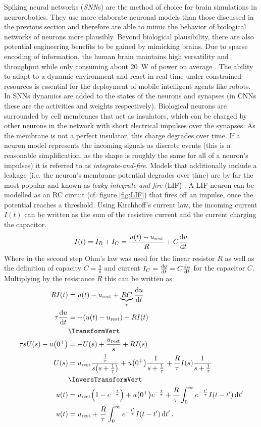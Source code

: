 Spiking neural networks (\emph{SNN}s) are the method of choice for brain simulations in neurorobotics. They use more elaborate neuronal models than those discussed in the previous section and therefore are able to mimic the behavior of biological networks of neurons more plausibly. Beyond biological plausibility, there are also potential engineering benefits to be gained by mimicking brains. Due to sparse encoding of information, the human brain maintains high versatility and throughput while only consuming about \SI{20}{\watt} of power on average \cite{brainexplained}. The ability to adapt to a dynamic environment and react in real-time under constrained resources is essential for the deployment of mobile intelligent agents like robots. In SNNs dynamics are added to the states of the neurons and synapses (in CNNs these are the activities and weights respectively). Biological neurons are surrounded by cell membranes that act as insulators, which can be charged by other neurons in the network with short electrical impulses over the synapses. As the membrane is not a perfect insulator, this charge degrades over time. If a neuron model represents the incoming signals as discrete events (this is a reasonable simplification, as the shape is roughly the same for all of a neuron's impulses) it is referred to as \emph{integrate-and-fire}. Models that additionally include a leakage (i.e. the neuron's membrane potential degrades over time) are by far the most popular and known as \emph{leaky integrate-and-fire} (LIF) \cite{hodgkin1952quantitative,burkitt2006review}. A LIF neuron can be modelled as an RC circuit (cf. figure \ref{fig:LIF}) that fires off an impulse, once the potential reaches a threshold. Using Kirchhoff's current law, the incoming current $I(t)$ can be written as the sum of the resistive current and the current charging the capacitor.
\begin{align}
    I(t) = I_R + I_C =  \frac{u(t) - u_\mathrm{rest}}{R}+C\dv{u}{t}
\end{align}
Where in the second step Ohm's law was used for the linear resistor $R$ as well as the definition of capacity $C=\frac{q}{u}$ and current $I_C=\dv{q}{t}=C\dv{u}{t}$ for the capacitor $C$. Multiplying by the resistance $R$ this can be written as
\begin{align}
    R I(t) &=  u(t) - u_\mathrm{rest}+\underbrace{RC}_{\tau}\dv{u}{t}\\
    \tau \dv{u}{t}&= -\qty(u(t)-u_\mathrm{rest})+RI(t)\label{eq:LIF}\\
    &\TransformVert\\
    \tau s U(s) - u\qty(0^+) &= -U(s)+\frac{u_\mathrm{rest}}{s}+R I(s)\\
    U(s) &= u_\mathrm{rest}\frac{\frac{1}{\tau}}{s\qty(s+\frac{1}{\tau})}+u\qty(0^+)\frac{1}{s+\frac{1}{\tau}}+\frac{R}{\tau}I(s) \frac{1}{s+\frac{1}{\tau}}\\
    &\InversTransformVert\\
    u(t) &= u_\mathrm{rest}\qty(1-e^{-\frac{t}{\tau}})+u\qty(0^+)e^{-\frac{t}{\tau}}+\frac{R}{\tau}\int_0^\infty e^{-\frac{t'}{\tau}}I(t-t')\dd{t'}\\
    u(t)&=u_\mathrm{rest}+\frac{R}{\tau}\int_0^\infty e^{-\frac{t'}{\tau}}I(t-t')\dd{t'}\label{eq:LIF-solution}.
\end{align}

